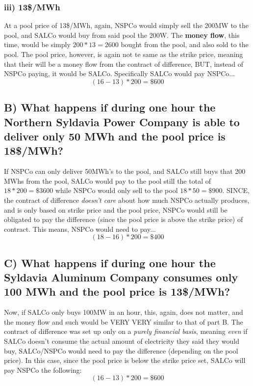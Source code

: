 \documentclass{article}
\begin{document}
\subsubsection{iii) 13\$/MWh}
At a pool price of 13\$/MWh, again, NSPCo would simply sell the 200MW to the pool, and SALCo would buy from said pool the 200W. The \textbf{money flow}, this time, would be simply $200*13 = 2600$ bought from the pool, and also sold to the pool. The pool price, however, is again not te same as the strike price, meaning that their will be a money flow from the contract of difference, BUT, instead of NSPCo paying, it would be SALCo. Specifically SALCo would pay NSPCo... $$ (16-13)*200 = \$600 $$

\subsection{B) What happens if during one hour the Northern Syldavia Power Company is able to deliver only 50 MWh and the pool price is 18\$/MWh?}
If NSPCo can only deliver 50MWh's to the pool, and SALCo still buys that 200 MWhs from the pool, SALCo would pay to the pool still the total of $18*200 = \$3600$ while NSPCo would only sell to the pool $18*50 = \$900$. SINCE, the contract of difference \textit{doesn't care} about how much NSPCo actually produces, and is only based on strike price and the pool price, NSPCo would still be obligated to pay the difference (since the pool price is above the strike price) of contract. This means, NSPCo would need to pay... $$ (18-16)*200 = \$400 $$


\subsection{C) What happens if during one hour the Syldavia Aluminum Company consumes only 100 MWh and the pool price is 13\$/MWh?}
Now, if SALCo only buys 100MW in an hour, this, again, does not matter, and the money flow and such would be VERY VERY similar to that of part B. The contract of difference was set up only on a \textit{purely financial basis}, meaning \textit{even} if SALCo doesn't consume the actual amount of electricity they said they would buy, SALCo/NSPCo would need to pay the difference (depending on the pool price). In this case, since the pool price is below the strike price set, SALCo will pay NSPCo the following: $$ (16-13)*200 = \$600 $$

\pagebreak
\end{document}
